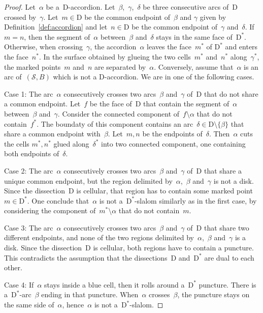 \documentclass{amsart}
\theoremstyle{definition}
\newcommand{\yann}[1]{\todo[color=red!30]{#1 --- Y.}}
\newcommand{\surface}{\mathcal{S}} %
\newcommand{\dual}{^*} %
\newcommand{\dissection}{\mathrm{D}} %
\begin{document}
\begin{proof}
\yann{I have to merge two cases}
Let~$\alpha$ be a~$\dissection$-accordion.
Let~$\beta$,~$\gamma$,~$\delta$ be three consecutive arcs of~$\dissection$ crossed by~$\gamma$.
Let~$m\in\dissection$ be the common endpoint of~$\beta$ and $\gamma$ given by Definition~\ref{def:accordion} and let~$n\in\dissection$ be the common endpoint of~$\gamma$ and~$\delta$.
If $m=n$, then the segment of~$\alpha$ between~$\beta$ and~$\delta$ stays in the same face of~$\dissection\dual$.
Otherwise, when crossing~$\gamma$, the accordion~$\alpha$ leaves the face~$m\dual$ of $\dissection\dual$ and enters the face~$n\dual$.
In the surface obtained by glueing the two cells~$m\dual$ and~$n\dual$ along~$\gamma\dual$, the marked points~$m$ and~$n$ are separated by~$\alpha$.
Conversely, assume that~$\alpha$ is an arc of~$(\surface, B)$ which is not a $\dissection$-accordion.
We are in one of the following cases.

Case 1: The arc~$\alpha$ consecutively crosses two arcs~$\beta$ and~$\gamma$ of~$\dissection$ that do not share a common endpoint.
Let~$f$ be the face of~$\dissection$ that contain the segment of~$\alpha$ between~$\beta$ and~$\gamma$.
Consider the connected component of~$f\setminus\alpha$ that do not contain~$f\dual$.
The boundaty of this component contains an arc~$\delta\in\dissection\setminus\{\beta\}$ that share a common endpoint with~$\beta$.
Let~$m,n$ be the endpoints of~$\delta$.
Then~$\alpha$ cuts the cells $m\dual,n\dual$ glued along~$\delta\dual$ into two connected component, one containing both endpoints of~$\delta$.

Case 2: The arc~$\alpha$ consecutively crosses two arcs~$\beta$ and~$\gamma$ of~$\dissection$ that share a unique common endpoint, but the region delimited by~$\alpha$,~$\beta$ and~$\gamma$ is not a disk.
Since the dissection~$\dissection$ is cellular, that region has to contain some marked point~$m\in\dissection\dual$.
One conclude that~$\alpha$ is not a~$\dissection\dual$-slalom similarly as in the first case, by considering the component of~$m\dual\setminus\alpha$ that do not contain~$m$.

Case 3: The arc~$\alpha$ consecutively crosses two arcs~$\beta$ and~$\gamma$ of~$\dissection$ that share two different endpoints, and none of the two regions delimited by~$\alpha$,~$\beta$ and~$\gamma$ is a disk.
Since the dissection~$\dissection$ is cellular, both regions have to contain a puncture.
This contradicts the assumption that the dissections~$\dissection$ and~$\dissection\dual$ are dual to each other.

Case 4: If~$\alpha$ stays inside a blue cell, then it rolls around a~$\dissection\dual$ puncture.
There is a~$\dissection\dual$-arc~$\beta$ ending in that puncture. When~$\alpha$ crosses~$\beta$, the puncture stays on the same side of~$\alpha$, hence~$\alpha$ is not a~$\dissection\dual$-slalom.
\end{proof}
\end{document}
